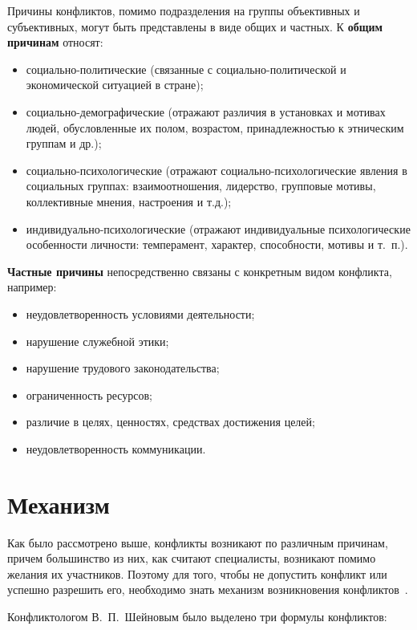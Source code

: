 Причины конфликтов, помимо подразделения на группы объективных и субъективных,
могут быть представлены в виде общих и частных. К \textbf{общим причинам} относят:
\begin{itemize}
    \item социально-политические (связанные с социально-политической и
        экономической ситуацией в стране);
    \item социально-демографические (отражают различия в установках и мотивах
        людей, обусловленные их полом, возрастом, принадлежностью к этническим
        группам и др.);
    \item социально-психологические (отражают социально-психологические явления
        в социальных группах: взаимоотношения, лидерство, групповые мотивы,
        коллективные мнения, настроения и т.д.);
    \item индивидуально-психологические (отражают индивидуальные
        психологические особенности личности: темперамент, характер,
        способности, мотивы и т.~п.).
\end{itemize}

\textbf{Частные причины} непосредственно связаны с конкретным видом конфликта,
например:
\begin{itemize}
    \item неудовлетворенность условиями деятельности;
    \item нарушение служебной этики;
    \item нарушение трудового законодательства;
    \item ограниченность ресурсов;
    \item различие в целях, ценностях, средствах достижения целей;
    \item неудовлетворенность коммуникации.
\end{itemize}

\section{Механизм}

Как было рассмотрено выше, конфликты возникают по различным причинам,
причем большинство из них, как считают специалисты, возникают помимо желания
их участников. Поэтому для того, чтобы не допустить конфликт или успешно
разрешить его, необходимо знать механизм возникновения конфликтов~\cite{art02}.

Конфликтологом В.~П.~Шейновым было выделено три формулы конфликтов:


